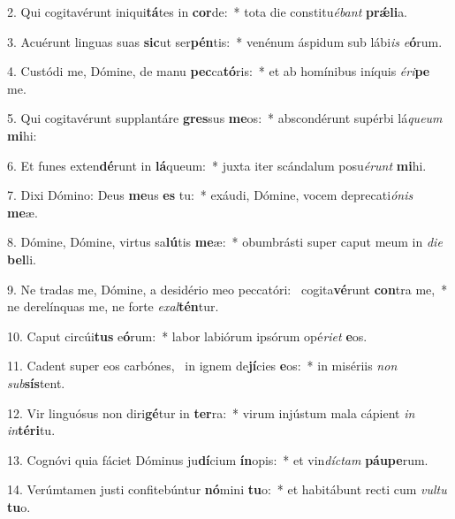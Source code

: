 2. Qui cogitavérunt iniqui\textbf{tá}tes in \textbf{cor}de:~*  tota die constitu\textit{é}\textit{bant} \textbf{prǽ}\textbf{li}a.\

3. Acuérunt linguas suas \textbf{sic}ut ser\textbf{pén}tis:~*  venénum áspidum sub lábi\textit{is} \textit{e}\textbf{ó}rum.\

4. Custódi me, Dómine, de manu \textbf{pec}ca\textbf{tó}ris:~*  et ab homínibus iníquis \textit{é}\textit{ri}\textbf{pe} me.\

5. Qui cogitavérunt supplantáre \textbf{gres}sus \textbf{me}os:~*  abscondérunt supérbi lá\textit{que}\textit{um} \textbf{mi}hi:\

6. Et funes exten\textbf{dé}runt in \textbf{lá}queum:~*  juxta iter scándalum posu\textit{é}\textit{runt} \textbf{mi}hi.\

7. Dixi Dómino: Deus \textbf{me}us \textbf{es} tu:~*  exáudi, Dómine, vocem deprecati\textit{ó}\textit{nis} \textbf{me}æ.\

8. Dómine, Dómine, virtus sa\textbf{lú}tis \textbf{me}æ:~*  obumbrásti super caput meum in \textit{di}\textit{e} \textbf{bel}li.\

9. Ne tradas me, Dómine, a desidério meo peccatóri: \dag\  cogita\textbf{vé}runt \textbf{con}tra me,~*  ne derelínquas me, ne forte \textit{ex}\textit{al}\textbf{tén}tur.\

10. Caput circúi\textbf{tus} e\textbf{ó}rum:~*  labor labiórum ipsórum opé\textit{ri}\textit{et} \textbf{e}os.\

11. Cadent super eos carbónes, \dag\  in ignem de\textbf{jí}cies \textbf{e}os:~*  in misériis \textit{non} \textit{sub}\textbf{sís}tent.\

12. Vir linguósus non diri\textbf{gé}tur in \textbf{ter}ra:~*  virum injústum mala cápient \textit{in} \textit{in}\textbf{tér}\textbf{i}tu.\

13. Cognóvi quia fáciet Dóminus ju\textbf{dí}cium \textbf{ín}opis:~*  et vin\textit{díc}\textit{tam} \textbf{páu}\textbf{pe}rum.\

14. Verúmtamen justi confitebúntur \textbf{nó}mini \textbf{tu}o:~*  et habitábunt recti cum \textit{vul}\textit{tu} \textbf{tu}o.\

